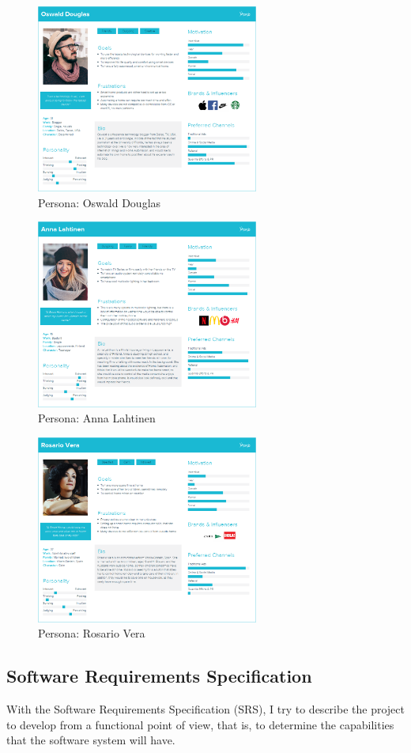 \begin{figure}
	\centering
	\includegraphics[width=0.65\textwidth]{images/Chapter_06/persona-oswald-douglas.png}
	\caption{Persona: Oswald Douglas}
	\label{fig:persona-oswald-douglas}
\end{figure}

\begin{figure}
	\centering
	\includegraphics[width=0.65\textwidth]{images/Chapter_06/persona-anna-lahtinen.png}
	\caption{Persona: Anna Lahtinen}
	\label{fig:persona-anna-lahtinen}
\end{figure}

\begin{figure}
	\centering
	\includegraphics[width=0.65\textwidth]{images/Chapter_06/persona-rosario-vera.png}
	\caption{Persona: Rosario Vera}
	\label{fig:persona-rosario-vera}
\end{figure}

\subsection{Software Requirements Specification}
With the Software Requirements Specification (SRS), I try to describe the project to develop from a functional point of view, that is,
to determine the capabilities that the software system will have.
